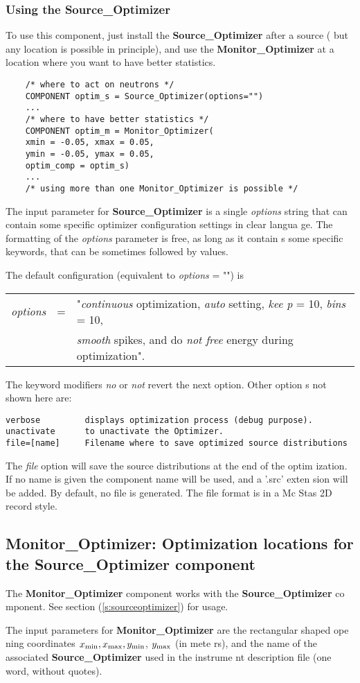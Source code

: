 \documentclass[12pt]{report}
\begin{document}
\subsubsection{Using the Source\_Optimizer}

To use this component, just install the {\bf Source\_Optimizer} after a source (
but any location is possible in principle), and use the {\bf Monitor\_Optimizer}
 at a location where you want to have better statistics.

\begin{verbatim}
    /* where to act on neutrons */
    COMPONENT optim_s = Source_Optimizer(options="") 
    ...
    /* where to have better statistics */
    COMPONENT optim_m = Monitor_Optimizer( 
    xmin = -0.05, xmax = 0.05, 
    ymin = -0.05, ymax = 0.05,
    optim_comp = optim_s) 
    ...
    /* using more than one Monitor_Optimizer is possible */
\end{verbatim}

The input parameter for {\bf Source\_Optimizer} is a single {\it options} string
 that can contain some specific optimizer configuration settings in clear langua
ge. The formatting of the {\it options} parameter is free, as long as it contain
s some specific keywords, that can be sometimes followed by values.

The default configuration (equivalent to {\it options} = "") is
\begin{center}
\begin{tabular}{rcl}
{\it options} & = & "{\it continuous} optimization, {\it auto} setting, {\it kee
p} = 10, {\it bins} = 10, \\
& & {\it smooth} spikes, and do {\it not free} energy during optimization".
\end{tabular}
\end{center}
The keyword modifiers {\it no} or {\it not} revert the next option. Other option
s not shown here are:
\begin{verbatim}
verbose         displays optimization process (debug purpose).
unactivate      to unactivate the Optimizer.
file=[name]     Filename where to save optimized source distributions
\end{verbatim}
The {\it file} option will save the source distributions at the end of the optim
ization. If no name is given the component name will be used, and a '.src' exten
sion will be added. By default, no file is generated. The file format is in a Mc
Stas 2D record style.

\subsection{Monitor\_Optimizer: Optimization locations for the Source\_Optimizer
 component}
\label{s:monitoroptimizer}

The {\bf Monitor\_Optimizer} component works with the {\bf Source\_Optimizer} co
mponent. See section (\ref{s:sourceoptimizer}) for usage.

The input parameters for {\bf Monitor\_Optimizer} are the rectangular shaped ope
ning coordinates $x_{\rm min}, x_{\rm max}, y_{\rm min}$, $y_{\rm max}$ (in mete
rs), and the name of the associated {\bf Source\_Optimizer} used in the instrume
nt description file (one word, without quotes).
\end{document}
